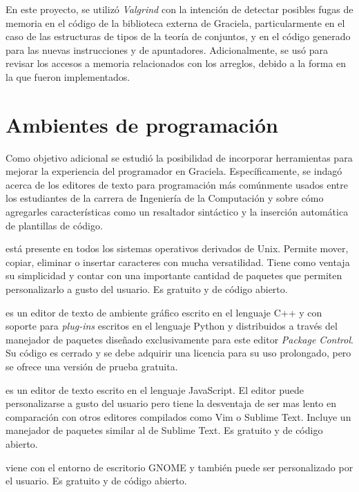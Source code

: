 En este proyecto, se utilizó \textit{Valgrind} con la intención de detectar
posibles fugas de memoria en el código de la biblioteca externa de Graciela,
particularmente en el caso de las estructuras de tipos de la teoría de
conjuntos, y en el código generado para las nuevas instrucciones  y
 de apuntadores. Adicionalmente, se usó para revisar los accesos a
memoria relacionados con los arreglos, debido a la forma en la que fueron
implementados.

\section{Ambientes de programación}

Como objetivo adicional se estudió la posibilidad de incorporar herramientas
para mejorar la experiencia del programador en Graciela. Específicamente, se
indagó acerca de los editores de texto para programación más comúnmente usados
entre los estudiantes de la carrera de Ingeniería de la Computación y sobre cómo
agregarles características como un resaltador sintáctico y la inserción
automática de plantillas de código.

\begin{description}[leftmargin=!,labelwidth=\widthof{\bfseries Sublime Text}]

  \item [Vi / Vim] está presente en todos los sistemas operativos derivados de
  Unix. Permite mover, copiar, eliminar o insertar caracteres con mucha
  versatilidad. Tiene como ventaja su simplicidad y contar con una importante
  cantidad de paquetes que permiten personalizarlo a gusto del usuario. Es
  gratuito y de código abierto.

  \item [Sublime Text] es un editor de texto de ambiente gráfico escrito en el
  lenguaje C++ y con soporte para \textit{plug-ins} escritos en el lenguaje
  Python y distribuidos a través del manejador de paquetes diseñado
  exclusivamente para este editor \textit{Package Control}. Su código es cerrado
  y se debe adquirir una licencia para su uso prolongado, pero se ofrece una
  versión de prueba gratuita.

  \item [Atom] es un editor de texto escrito en el lenguaje JavaScript. El
  editor puede personalizarse a gusto del usuario pero tiene la desventaja de
  ser mas lento en comparación con otros editores compilados como Vim o Sublime
  Text. Incluye un manejador de paquetes similar al de Sublime Text. Es gratuito
  y de código abierto.

  \item [Gedit] viene con el entorno de escritorio GNOME y también puede ser
  personalizado por el usuario. Es gratuito y de código abierto.

\end{description}

